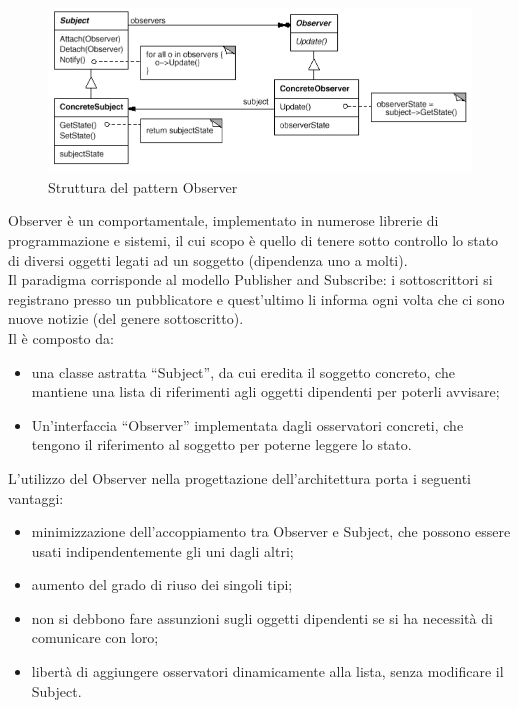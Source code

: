 	 \label{app:observer}
		\begin{figure}[H]\centering
        \includegraphics[scale=0.7]{SpecificaTecnica/Pics/Observer}
        \caption{Struttura del pattern Observer}
		\end{figure}
		Observer è un  comportamentale, implementato in numerose librerie di programmazione e sistemi, il cui scopo è quello di tenere sotto controllo lo stato di diversi oggetti legati ad un soggetto (dipendenza uno a molti). \\
		Il paradigma corrisponde al modello Publisher and Subscribe: i sottoscrittori si registrano presso un pubblicatore e quest’ultimo li informa ogni volta che ci sono nuove notizie (del genere sottoscritto).\\
		Il  è composto da:
		\begin{itemize}
		\item una classe astratta “Subject”, da cui eredita il soggetto concreto, che mantiene una lista di riferimenti agli oggetti dipendenti per poterli avvisare;
		\item Un’interfaccia “Observer” implementata dagli osservatori concreti, che tengono il riferimento al soggetto per poterne leggere lo stato.
		\end{itemize}
			L’utilizzo del  Observer nella progettazione dell’architettura porta i seguenti vantaggi:
			\begin{itemize}
			\item minimizzazione dell’accoppiamento tra Observer e Subject, che possono essere usati indipendentemente gli uni dagli altri;
			\item aumento del grado di riuso dei singoli tipi;
			\item non si debbono fare assunzioni sugli oggetti dipendenti se si ha necessità di comunicare con loro;
			\item libertà di aggiungere osservatori dinamicamente alla lista, senza modificare il Subject.
			\end{itemize}

